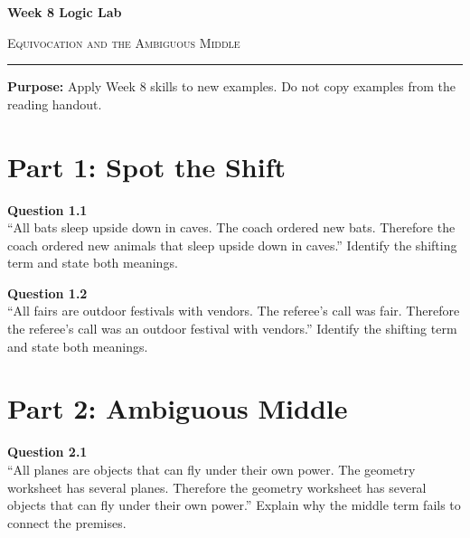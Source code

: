 \documentclass[12pt]{article}
\begin{document}
\begin{center}
{\LARGE\bfseries Week 8 Logic Lab}\par\vspace{0.05em}
{\large\scshape Equivocation and the Ambiguous Middle}\par\vspace{0.1em}
\rule{0.78\textwidth}{0.5pt}\par\vspace{0.15em}
\end{center}

\noindent\textbf{Purpose:} Apply Week 8 skills to new examples. Do not copy examples from the reading handout.

\vspace{0.3em}

\section*{Part 1: Spot the Shift}

\textbf{Question 1.1}\\[-0.15em]
``All bats sleep upside down in caves. The coach ordered new bats. Therefore the coach ordered new animals that sleep upside down in caves.'' Identify the shifting term and state both meanings.


\textbf{Question 1.2}\\[-0.15em]
``All fairs are outdoor festivals with vendors. The referee's call was fair. Therefore the referee's call was an outdoor festival with vendors.'' Identify the shifting term and state both meanings.


\newpage

\section*{Part 2: Ambiguous Middle}

\textbf{Question 2.1}\\[-0.15em]
``All planes are objects that can fly under their own power. The geometry worksheet has several planes. Therefore the geometry worksheet has several objects that can fly under their own power.'' Explain why the middle term fails to connect the premises.


\newpage
\end{document}
